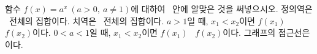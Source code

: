 함수 $f(x)=a^x\ (a>0,\ a\ne 1)$에 대하여 \blank\ 안에 알맞은 것을 써넣으시오.
 정의역은 \blank[3em]\ 전체의 집합이다.
 치역은 \blank[4.5em]\ 전체의 집합이다.
 $a>1$일 때, $x_1<x_2$이면 $f(x_1)$ \blank\ $f(x_2)$이다.
 $0<a<1$일 때, $x_1<x_2$이면 $f(x_1)$ \blank\ $f(x_2)$이다.
 그래프의 점근선은 \blank[3em]이다.

